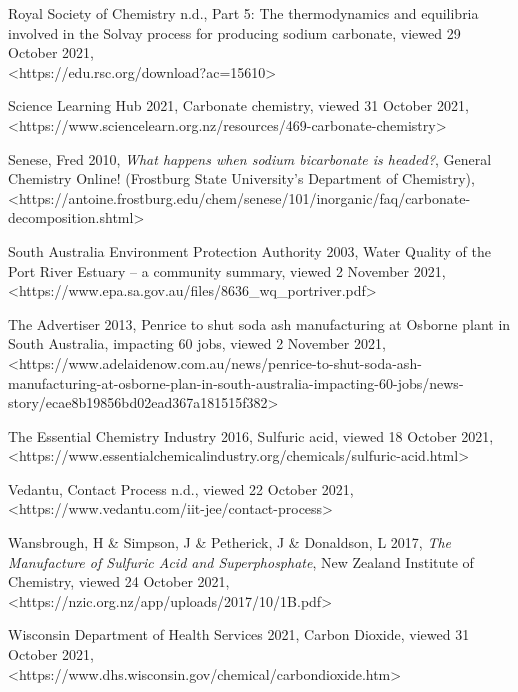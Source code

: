 \documentclass[12pt, a4paper]{article}
\begin{document}
Royal Society of Chemistry n.d., Part 5: The thermodynamics and equilibria involved in the Solvay process for producing sodium carbonate, viewed 29 October 2021, \\ \textless{https://edu.rsc.org/download?ac=15610}\textgreater

Science Learning Hub 2021, Carbonate chemistry, viewed 31 October 2021, \\ \textless{https://www.sciencelearn.org.nz/resources/469-carbonate-chemistry}\textgreater

Senese, Fred 2010, \emph{What happens when sodium bicarbonate is headed?}, General Chemistry Online! (Frostburg State University's Department of Chemistry), \\ \textless{https://antoine.frostburg.edu/chem/senese/101/inorganic/faq/carbonate-decomposition.shtml}\textgreater

South Australia Environment Protection Authority 2003, Water Quality of the Port River Estuary – a community summary, viewed 2 November 2021, \\ \textless{https://www.epa.sa.gov.au/files/8636_wq_portriver.pdf}\textgreater

The Advertiser 2013, Penrice to shut soda ash manufacturing at Osborne plant in South Australia, impacting 60 jobs, viewed 2 November 2021, \\ \textless{https://www.adelaidenow.com.au/news/penrice-to-shut-soda-ash-manufacturing-at-osborne-plan-in-south-australia-impacting-60-jobs/news-story/ecae8b19856bd02ead367a181515f382}\textgreater

The Essential Chemistry Industry 2016, Sulfuric acid, viewed 18 October 2021, \\ \textless{https://www.essentialchemicalindustry.org/chemicals/sulfuric-acid.html}\textgreater

Vedantu, Contact Process n.d., viewed 22 October 2021, \\ \textless{https://www.vedantu.com/iit-jee/contact-process}\textgreater

Wansbrough, H \& Simpson, J \& Petherick, J \& Donaldson, L 2017, \emph{The Manufacture of Sulfuric Acid and Superphosphate}, New Zealand Institute of Chemistry, viewed 24 October 2021, \\ \textless{https://nzic.org.nz/app/uploads/2017/10/1B.pdf}\textgreater

Wisconsin Department of Health Services 2021, Carbon Dioxide, viewed 31 October 2021, \\ \textless{https://www.dhs.wisconsin.gov/chemical/carbondioxide.htm}\textgreater
\end{document}

